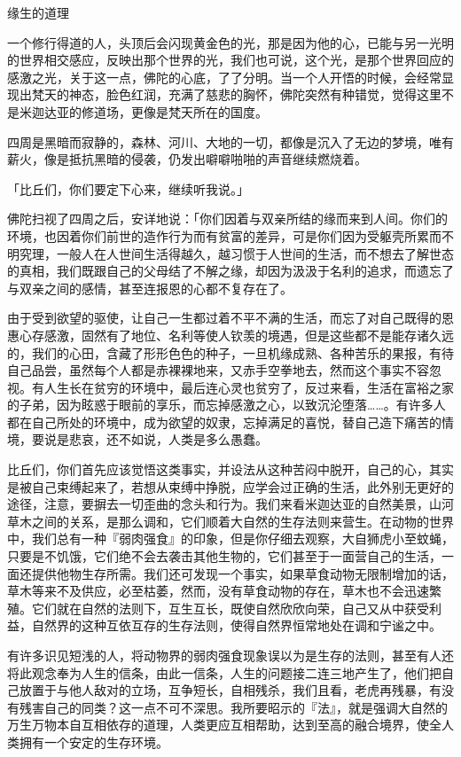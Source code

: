 \documentclass[12pt,twoside,openany]{book}
\begin{document}
缘生的道理

一个修行得道的人，头顶后会闪现黄金色的光，那是因为他的心，已能与另一光明的世界相交感应，反映出那个世界的光，我们也可说，这个光，是那个世界回应的感激之光，关于这一点，佛陀的心底，了了分明。当一个人开悟的时候，会经常显现出梵天的神态，脸色红润，充满了慈悲的胸怀，佛陀突然有种错觉，觉得这里不是米迦达亚的修道场，更像是梵天所在的国度。

四周是黑暗而寂静的，森林、河川、大地的一切，都像是沉入了无边的梦境，唯有薪火，像是抵抗黑暗的侵袭，仍发出噼噼啪啪的声音继续燃烧着。

「比丘们，你们要定下心来，继续听我说。」

佛陀扫视了四周之后，安详地说：「你们因着与双亲所结的缘而来到人间。你们的环境，也因着你们前世的造作行为而有贫富的差异，可是你们因为受躯壳所累而不明究理，一般人在人世间生活得越久，越习惯于人世间的生活，而不想去了解世态的真相，我们既跟自己的父母结了不解之缘，却因为汲汲于名利的追求，而遗忘了与双亲之间的感情，甚至连报恩的心都不复存在了。

由于受到欲望的驱使，让自己一生都过着不平不满的生活，而忘了对自己既得的恩惠心存感激，固然有了地位、名利等使人钦羡的境遇，但是这些都不是能存诸久远的，我们的心田，含藏了形形色色的种子，一旦机缘成熟、各种苦乐的果报，有待自己品尝，虽然每个人都是赤裸裸地来，又赤手空拳地去，然而这个事实不容忽视。有人生长在贫穷的环境中，最后连心灵也贫穷了，反过来看，生活在富裕之家的子弟，因为眩惑于眼前的享乐，而忘掉感激之心，以致沉沦堕落……。有许多人都在自己所处的环境中，成为欲望的奴隶，忘掉满足的喜悦，替自己造下痛苦的情境，要说是悲哀，还不如说，人类是多么愚蠢。

比丘们，你们首先应该觉悟这类事实，并设法从这种苦闷中脱开，自己的心，其实是被自己束缚起来了，若想从束缚中挣脱，应学会过正确的生活，此外别无更好的途径，注意，要摒去一切歪曲的念头和行为。我们来看米迦达亚的自然美景，山河草木之间的关系，是那么调和，它们顺着大自然的生存法则来营生。在动物的世界中，我们总有一种『弱肉强食』的印象，但是你仔细去观察，大自狮虎小至蚊蝇，只要是不饥饿，它们绝不会去袭击其他生物的，它们甚至于一面营自己的生活，一面还提供他物生存所需。我们还可发现一个事实，如果草食动物无限制增加的话，草木等来不及供应，必至枯萎，然而，没有草食动物的存在，草木也不会迅速繁殖。它们就在自然的法则下，互生互长，既使自然欣欣向荣，自己又从中获受利益，自然界的这种互依互存的生存法则，使得自然界恒常地处在调和宁谧之中。

有许多识见短浅的人，将动物界的弱肉强食现象误以为是生存的法则，甚至有人还将此观念奉为人生的信条，由此一信条，人生的问题接二连三地产生了，他们把自己放置于与他人敌对的立场，互争短长，自相残杀，我们且看，老虎再残暴，有没有残害自己的同类？这一点不可不深思。我所要昭示的『法』，就是强调大自然的万生万物本自互相依存的道理，人类更应互相帮助，达到至高的融合境界，使全人类拥有一个安定的生存环境。
\end{document}
